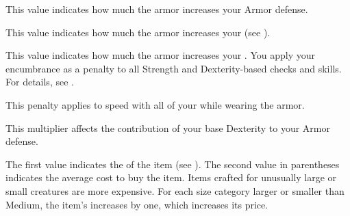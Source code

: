          This value indicates how much the armor increases your Armor defense.

         This value indicates how much the armor increases your  (see ).

         This value indicates how much the armor increases your .
        You apply your encumbrance as a penalty to all Strength and Dexterity-based checks and skills.
        For details, see .

         This penalty applies to speed with all of your  while wearing the armor.

         This multiplier affects the contribution of your base Dexterity to your Armor defense.

         The first value indicates the  of the item (see ).
        The second value in parentheses indicates the average cost to buy the item.
        Items crafted for unusually large or small creatures are more expensive.
        For each size category larger or smaller than Medium, the item's  increases by one, which increases its price.

